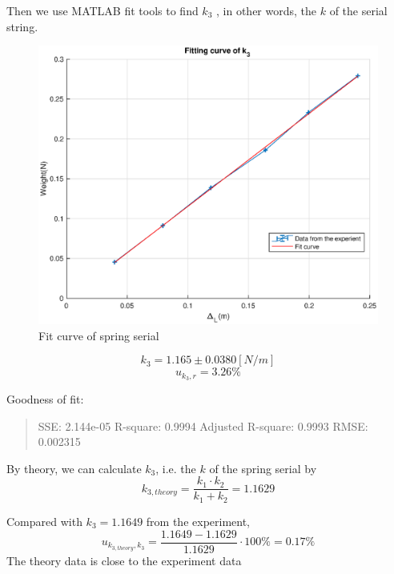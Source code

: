 Then we use MATLAB fit tools to find $k_3$ , in other words, the $k$ of the serial string.

\begin{figure}[H]
	\centering
	\includegraphics[width=15cm]{matlab/fitfig/k3}
	\caption{Fit curve of spring serial}
\end{figure}

$$k_3 = 1.165 \pm 0.0380 [N/m] $$
$$ u_{k_3,r} = 3.26 \% $$

Goodness of fit:
\begin{quote}
	\centering
	SSE: 2.144e-05
	R-square: 0.9994
	Adjusted R-square: 0.9993
	RMSE: 0.002315 
\end{quote}


By theory, we can calculate $k_3$, i.e. the $k$ of the spring serial by 
$$ k_{3,theory} = \frac{k_1 \cdot k_2 }{k_1 + k_2} =  1.1629 $$ 

Compared with $k_3 = 1.1649$  from the experiment,
$$ u_{k_{3,theory},k_3} = \frac{1.1649 - 1.1629}{1.1629} \cdot 100 \%  = 0.17 \% $$ 
The theory data is close to the experiment data
